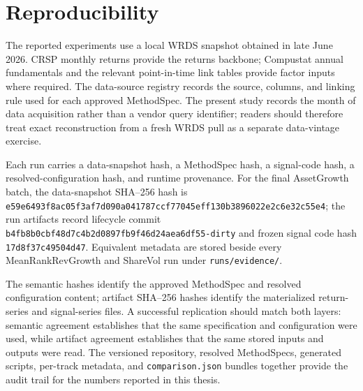 \section{Reproducibility}
\label{app:repro}

The reported experiments use a local WRDS snapshot obtained in late June
2026. CRSP monthly returns provide the returns backbone; Compustat annual
fundamentals and the relevant point-in-time link tables provide factor inputs
where required. The data-source registry records the source, columns, and
linking rule used for each approved MethodSpec. The present study records the
month of data acquisition rather than a vendor query identifier; readers
should therefore treat exact reconstruction from a fresh WRDS pull as a
separate data-vintage exercise.

Each run carries a data-snapshot hash, a MethodSpec hash, a signal-code hash,
a resolved-configuration hash, and runtime provenance. For the final
AssetGrowth batch, the data-snapshot SHA--256 hash is
\texttt{e59e6493f8ac05f3af7d090a041787ccf77045eff130b3896022e2c6e32c55e4};
the run artifacts record lifecycle commit
\texttt{b4fb8b0cbf48d7c4b2d0897fb9f46d24aea6df55-dirty} and frozen signal
code hash \texttt{17d8f37c49504d47}. Equivalent metadata are stored beside
every MeanRankRevGrowth and ShareVol run under \texttt{runs/evidence/}.

The semantic hashes identify the approved MethodSpec and resolved
configuration content; artifact SHA--256 hashes identify the materialized
return-series and signal-series files. A successful replication should match
both layers: semantic agreement establishes that the same specification and
configuration were used, while artifact agreement establishes that the same
stored inputs and outputs were read. The versioned repository, resolved
MethodSpecs, generated scripts, per-track metadata, and
\texttt{comparison.json} bundles together provide the audit trail for the
numbers reported in this thesis.
